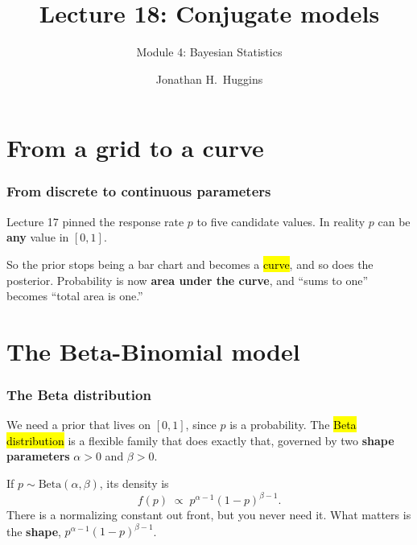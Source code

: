 \documentclass[slidestop,compress,mathserif]{beamer}
\title[Lecture 18]{Lecture 18: Conjugate models}
\subtitle{Module 4: Bayesian Statistics}
\author{Jonathan H.~Huggins}
\institute{}
\date{}
\begin{document}

\maketitleframe



\section{From a grid to a curve}

\begin{frame}
\frametitle{From discrete to continuous parameters}

Lecture 17 pinned the response rate $p$ to five candidate values. In reality $p$ can be \textbf{any} value in $[0,1]$.

\pause
\medskip

So the prior stops being a bar chart and becomes a \hl{curve}, and so does the posterior. Probability is now \textbf{area under the curve}, and ``sums to one'' becomes ``total area is one.''

\pause
\medskip


\end{frame}

\section{The Beta-Binomial model}

\begin{frame}
\frametitle{The Beta distribution}

We need a prior that lives on $[0,1]$, since $p$ is a probability. The \hl{Beta distribution} is a flexible family that does exactly that, governed by two \textbf{shape parameters} $\alpha > 0$ and $\beta > 0$.

\pause
\medskip

If $p \sim \text{Beta}(\alpha, \beta)$, its density is
\[
f(p) \;\propto\; p^{\alpha - 1}(1 - p)^{\beta - 1}.
\]
\pause
There is a normalizing constant out front, but you never need it. What matters is the \textbf{shape}, $p^{\alpha-1}(1-p)^{\beta-1}$.

\end{frame}
\end{document}
